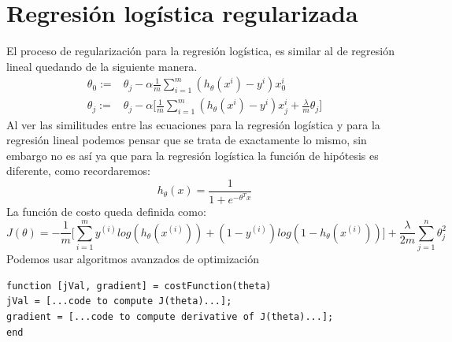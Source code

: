 \documentclass{report}
\begin{document}
\section{Regresión logística regularizada}
El proceso de regularización para la regresión logística, es similar al de regresión lineal quedando de la siguiente manera.
\begin{align*}
\theta_0:=&\theta_j-\alpha\frac{1}{m}\sum_{i=1}^{m}(h_\theta(x^i)-y^i)x_0^i\\
\theta_j:=&\theta_j-\alpha\Bigg[\frac{1}{m}\sum_{i=1}^{m}(h_\theta(x^i)-y^i)x_j^i+\frac{\lambda}{m}\theta_j\Bigg]
\end{align*}
Al ver las similitudes entre las ecuaciones para la regresión logística y para la regresión lineal podemos pensar que se trata de exactamente lo mismo, sin embargo no es así ya que para la regresión logística la función de hipótesis es diferente, como recordaremos:
\[
h_\theta(x)=\frac{1}{1+e^{-\theta^Tx}}
\]La función de costo queda definida como:
\[
J(\theta)=-\frac{1}{m}\Bigg[\sum_{i=1}^{m}y^{(i)}log(h_\theta(x^{(i)}))+(1-y^{(i)})log(1-h_\theta(x^{(i)}))\Bigg]+\frac{\lambda}{2m}\sum_{j=1}^{n}\theta^2_j
\]
Podemos usar algoritmos avanzados de optimización
\begin{lstlisting}[frame=single]
function [jVal, gradient] = costFunction(theta)
jVal = [...code to compute J(theta)...];
gradient = [...code to compute derivative of J(theta)...];
end
\end{lstlisting}
\end{document}
